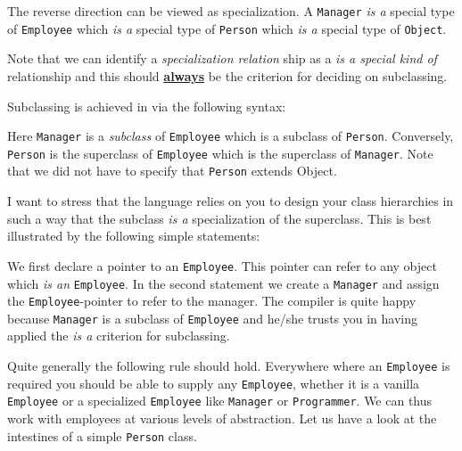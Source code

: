The reverse direction can be viewed as specialization. A \verb+Manager+ {\em is 
a} special type of \verb+Employee+ which {\em is a} special type of \verb+Person+ 
which {\em is a} special type of \verb+Object+. 

Note that we can identify a {\em specialization relation} ship as a 
{\em is a special kind of}
relationship and this should \underline{\bf always} be the criterion for
deciding on subclassing.

Subclassing is achieved in via the following syntax:


Here \verb+Manager+ is a {\em subclass} of \verb+Employee+ which is a subclass 
of \verb+Person+. Conversely, \verb+Person+ is the superclass of \verb+Employee+
which is the superclass of \verb+Manager+. Note that we did not have to specify
that \verb+Person+ extends Object. 

I want to stress that the language relies on you to design your class 
hierarchies in such a way that the subclass {\em is a} specialization of the 
superclass. This is best illustrated by the following simple statements:


We first declare a pointer to an \verb+Employee+. This pointer can refer to
any object which {\em is an} \verb+Employee+. In the second statement we create
a \verb+Manager+ and assign the \verb+Employee+-pointer to refer to the 
manager. The compiler is quite happy because \verb+Manager+ is a subclass of
\verb+Employee+ and he/she trusts you in having applied the {\em is a} criterion
for subclassing. 

Quite generally the following rule should hold. Everywhere where an 
\verb+Employee+ is required you should be able to supply any \verb+Employee+,
whether it is a vanilla \verb+Employee+ or a specialized \verb+Employee+
like \verb+Manager+ or \verb+Programmer+. We can thus work with employees
at various levels of abstraction. Let us have a look at the intestines of a 
simple \verb+Person+ class.

